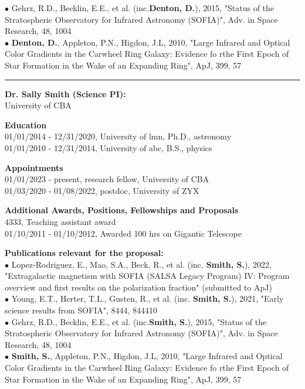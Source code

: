 {\scriptsize{$\bullet$}} Gehrz, R.D., Becklin, E.E., et al. (inc.\textbf{Denton, D.}), 2015, "Status of the Stratospheric Observatory for Infrared Astronomy (SOFIA)", Adv. in Space Research, 48, 1004\\
{\scriptsize{$\bullet$}} \textbf{Denton, D.}, Appleton, P.N., Higdon, J.L, 2010, "Large Infrared and Optical Color Gradients in the Carwheel Ring Galaxy: Evidence fo rthe First Epoch of Star Formation in the Wake of an Expanding Ring", ApJ, 399, 57
\medskip \hrule \vspace{5pt} \medskip
\textbf{\color{Blue}\large Dr. Sally Smith (Science PI):}\\
University of CBA
\par \vspace{-0.5em}
\textbf{Education}\\
01/01/2014 - 12/31/2020, University of lmn, Ph.D., astronomy\\
01/01/2010 - 12/31/2014, University of abc, B.S., physics
\par \vspace{-0.5em}
\textbf{Appointments}\\
01/01/2023 - present, research fellow, University of CBA\\
01/03/2020 - 01/08/2022, postdoc, University of ZYX
\par \vspace{-0.5em}
\textbf{Additional Awards, Positions, Fellowships and Proposals}\\
4333, Teaching assistant award\\
01/10/2011 - 01/10/2012, Awarded 100 hrs on Gigantic Telescope
\par \vspace{-0.5em}
\textbf{Publications relevant for the proposal:}\\
{\scriptsize{$\bullet$}} Lopez-Rodriguez, E., Mao, S.A., Beck, R., et al. (inc. \textbf{Smith, S.}), 2022, "Extragalactic magnetism with SOFIA (SALSA Legacy Program) IV: Program overview and first results on the polarization fraction" (submitted to ApJ)\\
{\scriptsize{$\bullet$}} Young, E.T., Herter, T.L., Gusten, R., et al. (inc. \textbf{Smith, S.}), 2021, "Early science results from SOFIA", 8444, 844410\\
{\scriptsize{$\bullet$}} Gehrz, R.D., Becklin, E.E., et al. (inc.\textbf{Smith, S.}), 2015, "Status of the Stratospheric Observatory for Infrared Astronomy (SOFIA)", Adv. in Space Research, 48, 1004\\
{\scriptsize{$\bullet$}} \textbf{Smith, S.}, Appleton, P.N., Higdon, J.L, 2010, "Large Infrared and Optical Color Gradients in the Carwheel Ring Galaxy: Evidence fo rthe First Epoch of Star Formation in the Wake of an Expanding Ring", ApJ, 399, 57
